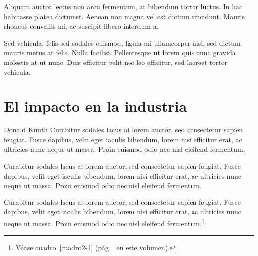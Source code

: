 Aliquam auctor lectus non arcu fermentum, at bibendum tortor luctus. In hac habitasse platea dictumst. Aenean non magna vel est dictum tincidunt. Mauris rhoncus convallis mi, ac suscipit libero interdum a.

Sed vehicula, felis sed sodales euismod, ligula mi ullamcorper nisl, sed dictum mauris metus at felis. Nulla facilisi. Pellentesque ut lorem quis nunc gravida molestie at ut nunc. Duis efficitur velit nec leo efficitur, sed laoreet tortor vehicula.

\section{El impacto en la industria}

Donald Knuth Curabitur sodales lacus at lorem auctor, sed consectetur sapien feugiat. Fusce dapibus, velit eget iaculis bibendum, lorem nisi efficitur erat, ac ultricies nunc neque ut massa. Proin euismod odio nec nisl eleifend fermentum.

Curabitur sodales lacus at lorem auctor, sed consectetur sapien feugiat. Fusce dapibus, velit eget iaculis bibendum, lorem nisi efficitur erat, ac ultricies nunc neque ut massa. Proin euismod odio nec nisl eleifend fermentum.

Curabitur sodales lacus at lorem auctor, sed consectetur sapien feugiat. Fusce dapibus, velit eget iaculis bibendum, lorem nisi efficitur erat, ac ultricies nunc neque ut massa. Proin euismod odio nec nisl eleifend fermentum.\footnote{Véase cuadro~\ref{cuadro2-1} (pág.~\pageref{cuadro2-1} en este volumen).}

